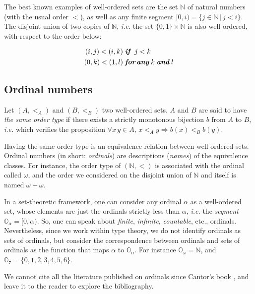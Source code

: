 The best known examples of well-ordered sets are the set $\mathbb{N}$ of natural numbers (with the usual order $<$), as well as any finite segment $[0,i)=\{j\in\mathbb{N}\,|\,j<i\}$.
The disjoint union of two copies of $\mathbb{N}$, \emph{i.e.} the set $\{0,1\}\times\mathbb{N}$ is also well-ordered,
with respect to the order below:

\begin{align*}
(i,j) < (i,k) & \;\textit{\textbf{if} }\; j < k\\
(0,k) < (1,l) & \;\textit{\textbf{for\,any}}\;k \;\textit{\textbf{and}} \; l
\end{align*}

\subsection{Ordinal numbers}


Let $(A,<_A)$ and $(B,<_B)$ two well-ordered sets. $A$ and $B$ are said to have \emph{the same order type} if 
there exists a strictly monotonous bijection $b$ from $A$ to $B$, \emph{i.e.} which verifies the proposition
$\forall x\,y\in A,\, x <_A y \Rightarrow b(x) <_B  b(y)$.

Having the same order type is an equivalence relation between well-ordered sets. Ordinal numbers (in short: \emph{ordinals})  are descriptions (\emph{names}) of the equivalence classes.
For instance, the order type of $(\mathbb{N},<)$ is associated with the ordinal called  $\omega$, and the order we considered on 
the disjoint union of $\mathbb{N}$ and itself is named $\omega+\omega$.

In a set-theoretic framework, one can consider any ordinal $\alpha$ as a well-ordered set, whose  elements are just the ordinals strictly less than $\alpha$, \emph{i.e.} the \emph{segment} $\mathbb{O}_\alpha=[0, \alpha)$. So, one can speak about \emph{finite}, \emph{infinite}, \emph{countable}, etc., ordinals. Nevertheless, since we work within type theory, 
we do not identify ordinals as sets of ordinals, but consider the correspondence between ordinals and sets of ordinals as the function that maps $\alpha$ to $\mathbb{O}_\alpha$.
For instance $\mathbb{O}_\omega=\mathbb{N}$, and $\mathbb{O}_7=\{0,1,2,3,4,5,6\}$.


We cannot cite all the literature published on ordinals since Cantor's book
\cite{cantorbook}, and 
leave it to the reader to explore the bibliography. 


